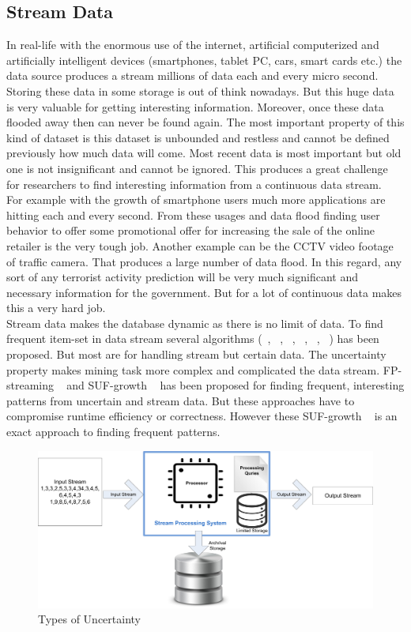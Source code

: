 \subsection{Stream Data}
In real-life with the enormous use of the internet, artificial computerized and artificially intelligent devices (smartphones, tablet PC, cars, smart cards etc.) the data source produces a stream millions of data each and every micro second. Storing these data in some storage is out of think nowadays. But this huge data is very valuable for getting interesting information. Moreover, once these data flooded away then can never be found again. The most important property of this kind of dataset is this dataset is unbounded and restless and cannot be defined previously how much data will come. Most recent data is most important but old one is not insignificant and cannot be ignored. This produces a great challenge for researchers to find interesting information from a continuous data stream.\\
For example with the growth of smartphone users much more applications are hitting each and every second. From these usages and data flood finding user behavior to offer some promotional offer for increasing the sale of the online retailer is the very tough job. Another example can be the CCTV video footage of traffic camera. That produces a large number of data flood. In this regard, any sort of any terrorist activity prediction will be very much significant and necessary information for the government. But for a lot of continuous data makes this a very hard job.\\
Stream data makes the database dynamic as there is no limit of data. To find frequent item-set in data stream several algorithms (~\cite{uncertain_01}, ~\cite{uncertain_02}, ~\cite{uncertain_03}, ~\cite{uncertain_04}, ~\cite{uncertain_05}, ~\cite{uncertain_06}) has been proposed. But most are for handling stream but certain data. The uncertainty property makes mining task more complex and complicated the data stream. FP-streaming ~\cite{suf_growth} and  SUF-growth ~\cite{suf_growth} has been proposed for finding frequent, interesting patterns from uncertain and stream data. But these approaches have to compromise runtime efficiency or correctness. However these SUF-growth ~\cite{suf_growth} is an exact approach to finding frequent patterns.
\begin{figure}
\centering
  \includegraphics[width=.9\textwidth]{images/stream_data.jpg}
\caption{Types of Uncertainty}
\label{figure:stream_data}
\end{figure}


